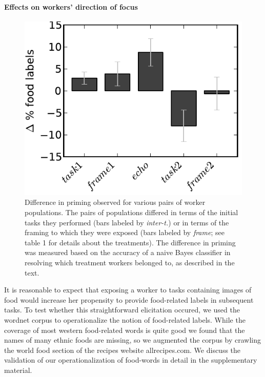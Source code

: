 \documentclass[12pt]{article}
\begin{document}
\paragraph{Effects on workers' direction of focus} 
\begin{figure}
	\centering
	\includegraphics[scale=1]{figs/delta_food.pdf}
	\caption{
		Difference in priming observed for various pairs of worker populations.
		The pairs of populations differed in terms of the initial tasks they
		performed (bars labeled by \textit{inter-t.}) or in terms of the framing
		to which they were exposed (bars labeled by \textit{frame}; see table 1 for
		details about the treatments).  The difference in priming was 
		measured based on the accuracy of a naive Bayes classifier in 
		resolving which treatment workers belonged to, as described in the 
		text.  
	}
	\label{fig:food}
\end{figure}

It is reasonable to expect that exposing a worker to tasks containing images
of food would increase her propensity to provide food-related labels in 
subsequent tasks.  To test whether this straightforward elicitation occured,
we used the wordnet corpus to operationalize the notion of food-related 
labels.  While the coverage of most western food-related words is quite good
we found that the names of many ethnic foods are missing, so we augmented
the corpus by crawling the world food section of the recipes website 
allrecipes.com.  We discuss the validation of our operationalization of 
food-words in detail in the supplementary material.
\end{document}
